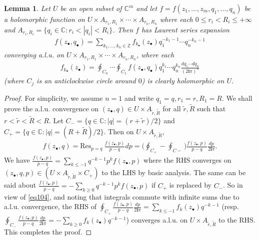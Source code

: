 \documentclass[11pt,b5paper,notitlepage]{article}
\theoremstyle{definition}
\theoremstyle{plain}
\newtheorem{lm}[df]{Lemma}
\newcommand{\wtd}{\widetilde}
\newcommand{\Res}{\mathrm{Res}}
\newcommand{\im}{\mathbf{i}}
\newcommand{\blt}{\bullet}
\newcommand{\Cbb}{\mathbb C}
\newcommand{\Zbb}{\mathbb Z}
\numberwithin{equation}{section}
\begin{document}
\begin{lm}\label{lb76}
Let $U$ be an open subset of $\Cbb^m$ and let $f=f(z_1,\dots,z_m,q_1,\dots,q_n)$ be a holomorphic function on $U\times A_{r_1,R_1}\times\cdots\times A_{r_n,R_n}$ where each $0\leq r_i<R_i\leq+\infty$ and $A_{r_i,R_i}=\{q_i\in\Cbb:r_i<|q_i|<R_i\}$. Then $f$ has Laurent series expansion
	\begin{align}
		f(z_\blt,q_\blt)=\sum_{k_1,\dots,k_n\in\Zbb}f_{k_\blt}(z_\blt)q_1^{-k_1-1}\cdots q_n^{-k_n-1}	
	\end{align}
converging a.l.u. on $U\times A_{r_1,R_1}\times\cdots\times A_{r_n,R_n}$, where each 
\begin{align}
f_{k_\blt}(z_\blt)=\oint_{C_n}\cdots \oint_{C_1}f(z_\blt,q_\blt)q_1^{k_1}\cdots q_n^{k_n}\frac{dq_1\cdots dq_n}	{(2\im\pi)^n}\label{eq104}
\end{align}
(where $C_j$ is an anticlockwise circle around $0$) is clearly holomorphic on $U$.
\end{lm}

\begin{proof}
For simplicity, we assume $n=1$ and write $q_1=q,r_1=r,R_1=R$. We shall prove the a.l.u. convergence on $(z_\blt,q)\in U\times A_{\wtd r,\wtd R}$ for all $\wtd r,\wtd R$ such that $r<\wtd r<\wtd R<R$.  Let $C_-=\{q\in\Cbb:|q|=(r+\wtd r)/2\}$ and $C_+=\{q\in\Cbb:|q|=(R+\wtd R)/2\}$. Then on $U\times A_{\wtd r,\wtd R}$,
\begin{align*}
f(z_\blt,q)=\Res_{p=q}~\frac{f(z_\blt,p)}{p-q}dp=\bigg(\oint_{C_+}-\oint_{C-}\bigg)\frac{f(z_\blt,p)}{p-q}\frac{dp}{2\im\pi}.
\end{align*}
We have $\frac{f(z_\blt,p)}{p-q}=\sum_{k\leq-1}q^{-k-1}p^kf(z_\blt,p)$ where the RHS converges on $(z_\blt,q,p)\in (U\times A_{\wtd r,\wtd R}\times C_+)$ to the LHS by basic analysis. The same can be said about $\frac{f(z_\blt,p)}{p-q}=-\sum_{k\geq0}q^{-k-1}p^kf(z_\blt,p)$ if $C_+$ is replaced by $C_-$. So in view of \eqref{eq104}, and noting that integrals commute with infinite sums due to a.l.u. convergence,  the RHS of $\oint_{C_+}\frac{f(z_\blt,p)}{p-q}\frac{dp}{2\im\pi}=\sum_{k\leq-1}f_k(z_\blt)q^{-k-1}$ (resp. $\oint_{C_-}\frac{f(z_\blt,p)}{p-q}\frac{dp}{2\im\pi}=-\sum_{k\geq0}f_k(z_\blt)q^{-k-1}$) converges a.l.u. on $U\times A_{\wtd r,\wtd R}$ to the RHS. This completes the proof.
\end{proof}



\subsection{}\label{lb72}
\end{document}
